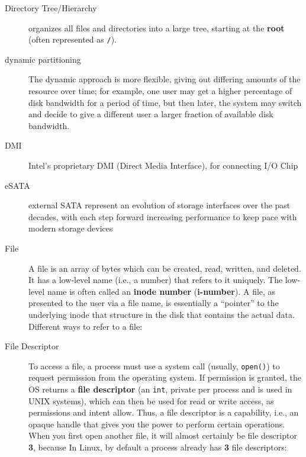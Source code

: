 \begin{description}
\item[Directory Tree/Hierarchy] organizes all files and directories into a large tree, starting at the \textbf{root} (often represented as \texttt{/}).

\item[dynamic partitioning] The dynamic approach is more flexible, giving out differing amounts of the resource over time; for example, one user may get a higher percentage of disk bandwidth for a period of time, but then later, the system may switch and decide to give a different user a larger fraction of available disk bandwidth.

\item[DMI]  Intel’s proprietary DMI (Direct Media Interface), for connecting I/O Chip

\item[eSATA] external SATA represent an evolution of storage interfaces over the past decades, with each step forward increasing performance to keep pace with modern storage devices

\item[File] A file is an array of bytes which can be created, read, written, and deleted. It has a low-level name (i.e., a number) that refers to it uniquely. The low-level name is often called an \textbf{inode number} (\textbf{i-number}).  A file, as presented to the user via a file name, is essentially a “pointer” to the underlying inode that structure in the disk that contains the actual data. Different ways to refer to a file:

\item[File Descriptor] To access a file, a process must use a system call (usually, \texttt{open()}) to request permission from the operating system. If permission is granted, the OS returns a \textbf{file descriptor} (an \texttt{int}, private per process and is used in UNIX systems), which can then be used for read or write access, as permissions and intent allow.  Thus, a file descriptor is a capability, i.e., an opaque handle that gives you the power to perform certain operations.  When you first open another file, it will almost certainly be file descriptor \textbf{3}, because In Linux, by default a process already has \textbf{3} file descriptors:



\end{description}
